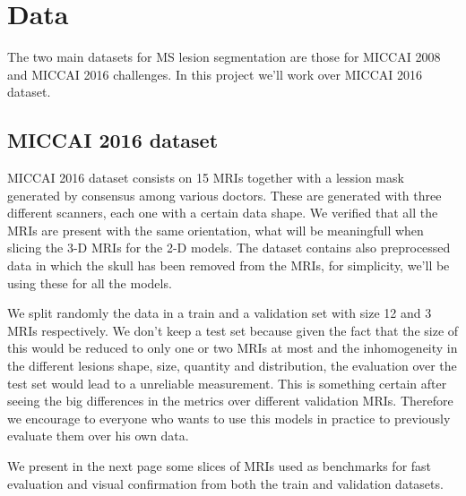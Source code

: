 \chapter{Data} 
\label{2.Data}




The two main datasets for MS lesion segmentation are those for MICCAI 2008 and MICCAI 2016 challenges. In this project we'll work over MICCAI 2016 dataset.

\section{MICCAI 2016 dataset}

MICCAI 2016 dataset consists on 15 MRIs together with a lession mask generated by consensus among various doctors. These are generated with three different scanners, each one with a certain data shape. We verified that all the MRIs are present with the same orientation, what will be meaningfull when slicing the 3-D MRIs for the 2-D models. The dataset contains also preprocessed data in which the skull has been removed from the MRIs, for simplicity, we'll be using these for all the models.

We split randomly the data in a train and a validation set with size 12 and 3 MRIs respectively. We don't keep a test set because given the fact that the size of this would be reduced to only one or two MRIs at most and the inhomogeneity in the different lesions shape, size, quantity and distribution, the evaluation over the test set would lead to a unreliable measurement. This is something certain after seeing the big differences in the metrics over different validation MRIs. Therefore we encourage to everyone who wants to use this models in practice to previously evaluate them over his own data.

We present in the next page some slices of MRIs used as benchmarks for fast evaluation and visual confirmation from both the train and validation datasets.

